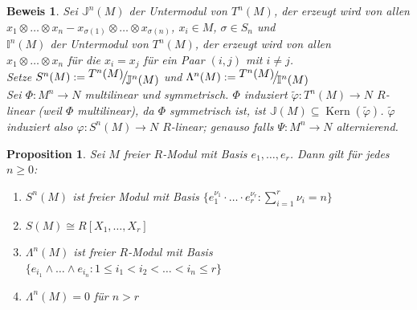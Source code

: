 \documentclass[a4paper,12pt]{scrbook}
\theoremstyle{break}
\newtheorem{Prop}[Def]{Proposition}
\theoremstyle{nonumberbreak}
\newtheorem{Bew}{Beweis}
\theoremstyle{nonumberplain}
\DeclareMathOperator{\Kern}{Kern}
\newcommand{\FakRaum}[2]{
  \raisebox{0.7ex}{\ensuremath{#1}}
  \ensuremath{\mkern-3mu}\big/\ensuremath{\mkern-3mu}
  \raisebox{-0.6ex}{\ensuremath{#2}}}
\begin{document}
\begin{Bew}
  Sei $\mathbb{J}^n(M)$ der Untermodul von $T^n(M)$, der erzeugt wird von allen\\
  $x_1 \otimes \dots \otimes x_n -x_{\sigma(1)} \otimes \dots \otimes x_{\sigma(n)}$, $x_i \in M$, $ \sigma \in S_n$ und \\
  $\mathbb{I}^n(M)$ der Untermodul von $T^n(M)$, der erzeugt wird von allen\\
  $x_1 \otimes \dots \otimes x_n$ für die $x_i = x_j$ für ein Paar $(i,j)$ mit $i \neq j$.\\
  Setze $S^n(M) := \FakRaum{T^n(M)}{\mathbb{J}^n(M)}$ und
  $\Lambda^n(M) := \FakRaum{T^n(M)}{\mathbb{I}^n(M)}$ \\
  Sei $\Phi: M^n \rightarrow N$ multilinear und symmetrisch. $\Phi$ induziert 
  $\tilde{\varphi}:T^n(M) \rightarrow N$ $R$-linear (weil $\Phi$ multilinear), da $\Phi$ symmetrisch ist, ist
  $\mathbb{J}(M) \subseteq \Kern(\tilde{\varphi})$. $\tilde{\varphi}$ induziert also $\varphi:S^n(M) \rightarrow N$
  $R$-linear; genauso falls $\Psi : M^n \rightarrow N$ alternierend.
\end{Bew}

\begin{Prop}
  Sei $M$ freier $R$-Modul mit Basis $e_1, \dots, e_r$. Dann gilt für jedes $n \geq 0$:
  \begin{enumerate}
  \item[a)] $S^n(M)$ ist freier Modul mit Basis $\{e_1^{\nu_1} \cdot \ldots \cdot e_r^{\nu_r}: \sum_{i=1}^{r}{\nu_i} =  n \}$
  \item[b)] $S(M) \cong R[X_1, \dots, X_r]$
  \item[c)] $\Lambda^n(M)$ ist freier $R$-Modul mit Basis \\
    $\{e_{i_1} \wedge \dots \wedge e_{i_n}: 1 \leq i_1 < i_2 < \dots < i_n \leq r \}$
  \item[d)] $\Lambda^n(M) = 0$ für $n > r$ 
  \end{enumerate}
\end{Prop}
 
\end{document}
